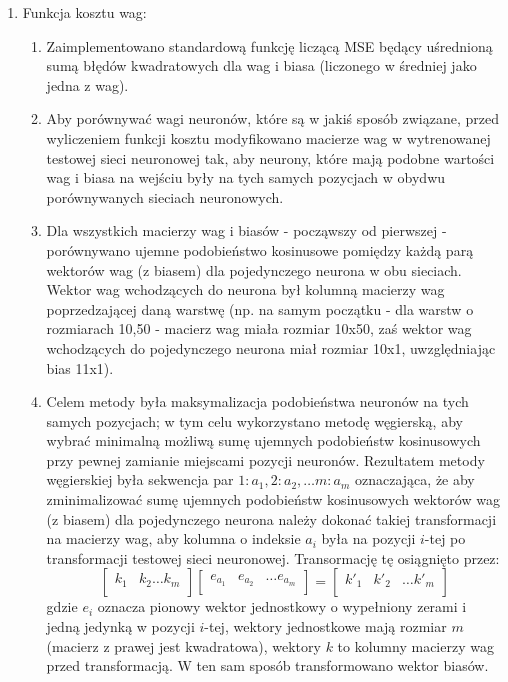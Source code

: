 \documentclass[12pt]{article}
\begin{document}
\begin{enumerate}
	
	\item \label{tit:cost} Funkcja kosztu wag:
	\begin{enumerate}
		\item Zaimplementowano standardową funkcję liczącą MSE będący uśrednioną sumą błędów kwadratowych dla wag i biasa (liczonego w średniej jako jedna z wag). \item Aby porównywać wagi neuronów, które są w jakiś sposób związane, przed wyliczeniem funkcji kosztu modyfikowano macierze wag w wytrenowanej testowej sieci neuronowej tak, aby neurony, które mają podobne wartości wag i biasa na wejściu były na tych samych pozycjach w obydwu porównywanych sieciach neuronowych.
		\item Dla wszystkich macierzy wag i biasów - począwszy od pierwszej - porównywano ujemne podobieństwo kosinusowe pomiędzy każdą parą wektorów wag (z biasem) dla pojedynczego neurona w obu sieciach. Wektor wag wchodzących do neurona był kolumną macierzy wag poprzedzającej daną warstwę (np. na samym początku - dla warstw o rozmiarach 10,50 - macierz wag miała rozmiar 10x50, zaś wektor wag wchodzących do pojedynczego neurona miał rozmiar 10x1, uwzględniając bias 11x1).
		\item Celem metody była maksymalizacja podobieństwa neuronów na tych samych pozycjach; w tym celu wykorzystano metodę węgierską, aby wybrać minimalną możliwą sumę ujemnych podobieństw kosinusowych przy pewnej zamianie miejscami pozycji neuronów. Rezultatem metody węgierskiej była sekwencja par $1:a_1, 2:a_2, \dots m:a_m$ oznaczająca, że aby zminimalizować sumę ujemnych podobieństw kosinusowych wektorów wag (z biasem) dla pojedynczego neurona należy dokonać takiej transformacji na macierzy wag, aby kolumna o indeksie $a_i$ była na pozycji \(i\)-tej po transformacji testowej sieci neuronowej. Transormację tę osiągnięto przez:
		$$\begin{bmatrix}
			k_1 & k_2 \dots k_m\\
		\end{bmatrix}
		\begin{bmatrix}
			e_{a_1} & e_{a_2} & \dots e_{a_m}\\
		\end{bmatrix}
		=
		\begin{bmatrix}
			k'_1 & k'_2 & \dots k'_m\\
		\end{bmatrix}
		$$
		gdzie \(e_i\) oznacza pionowy wektor jednostkowy o wypełniony zerami i jedną jedynką w pozycji \(i\)-tej, wektory jednostkowe mają rozmiar \(m\) (macierz z prawej jest kwadratowa), wektory \(k\) to kolumny macierzy wag przed transformacją. W ten sam sposób transformowano wektor biasów.

\end{enumerate}
\end{enumerate}
\end{document}
